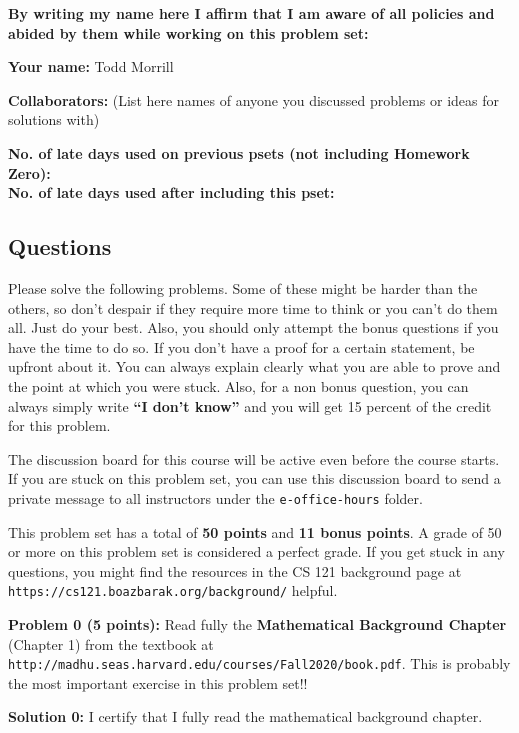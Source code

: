 \documentclass[11pt]{article}
\begin{document}
\textbf{By writing my name here I affirm that I am aware of all policies
and abided by them while working on this problem set:}

\textbf{Your name:} Todd Morrill

\textbf{Collaborators:} (List here names of anyone you discussed
problems or ideas for solutions with)

\textbf{No. of late days used on previous psets (not including Homework Zero): }\\
\textbf{No. of late days used after including this pset: }


\newpage


\subsection*{Questions}\label{questions}

Please solve the following problems. Some of these might be harder than
the others, so don't despair if they require more time to think or you
can't do them all. Just do your best. Also, you should only attempt the
bonus questions if you have the time to do so. If you don't have a proof
for a certain statement, be upfront about it. You can always explain
clearly what you are able to prove and the point at which you were
stuck. Also, for a non bonus question, you can always simply write
\textbf{``I don't know''} and you will get 15 percent of the credit for
this problem.

The discussion board for this course will be active even before the course
starts. If you are stuck on this problem set, you can use this discussion board to send
a private message to all instructors under the \texttt{e-office-hours}
folder.

This problem set has a total of \textbf{50 points} and \textbf{11 bonus
points}. A grade of 50 or more on this problem set is considered a
perfect grade. If you get stuck in any questions, you might find the
resources in the CS 121 background page at {\tt https://cs121.boazbarak.org/background/} helpful.

\textbf{Problem 0 (5 points):} Read fully the \textbf{Mathematical
Background Chapter} (Chapter 1) from the textbook at 
{\tt http://madhu.seas.harvard.edu/courses/Fall2020/book.pdf}.
This is probably the most important exercise in this problem set!!

\textbf{Solution 0:} I certify that I fully read the
mathematical background chapter.

\newpage
\end{document}
